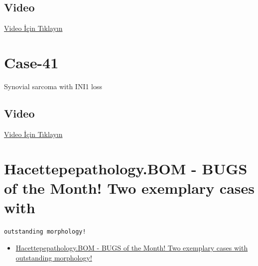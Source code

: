 \documentclass[
  letterpaper,
  DIV=11,
  numbers=noendperiod]{scrreprt}
\providecommand{\tightlist}{%
  \setlength{\itemsep}{0pt}\setlength{\parskip}{0pt}}\usepackage{longtable,booktabs,array}
\begin{document}
\hypertarget{video-38}{%
\subsection{Video}\label{video-38}}

\href{https://www.youtube.com/watch?v=In97sPfT9w4}{Video İçin Tıklayın}

\hypertarget{sec-hacettepe-com-case-41}{%
\section{Case-41}\label{sec-hacettepe-com-case-41}}

\begin{tcolorbox}[enhanced jigsaw, left=2mm, toprule=.15mm, rightrule=.15mm, bottomrule=.15mm, leftrule=.75mm, colback=white, colframe=quarto-callout-tip-color-frame, toptitle=1mm, breakable, titlerule=0mm, colbacktitle=quarto-callout-tip-color!10!white, bottomtitle=1mm, title=\textcolor{quarto-callout-tip-color}{\faLightbulb}\hspace{0.5em}{Tanı}, arc=.35mm, opacitybacktitle=0.6, opacityback=0, coltitle=black]

Synovial sarcoma with INI1 loss

\end{tcolorbox}

\hypertarget{video-39}{%
\subsection{Video}\label{video-39}}

\href{https://www.youtube.com/watch?v=1Qq67jVEfUA}{Video İçin Tıklayın}

\hypertarget{hacettepepathology.bom---bugs-of-the-month-two-exemplary-cases-with}{%
\section{Hacettepepathology.BOM - BUGS of the Month! Two exemplary cases
with}\label{hacettepepathology.bom---bugs-of-the-month-two-exemplary-cases-with}}

\begin{verbatim}
outstanding morphology!
\end{verbatim}

\begin{itemize}
\tightlist
\item
  \href{https://www.youtube.com/watch?v=hF7jSmHiiYQ\&ab_channel=KemalKosemehmetoglu}{Hacettepepathology.BOM
  - BUGS of the Month! Two exemplary cases with outstanding morphology!}
\end{itemize}
\end{document}
